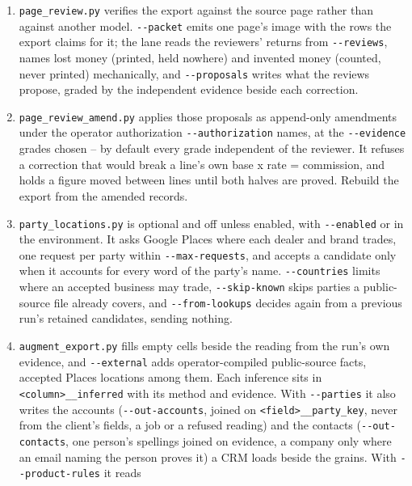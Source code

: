 \documentclass[
]{article}
\providecommand{\tightlist}{%
  \setlength{\itemsep}{0pt}\setlength{\parskip}{0pt}}
\begin{document}
\begin{enumerate}
\def\labelenumi{\arabic{enumi}.}
\tightlist
\item
  \texttt{page\_\allowbreak{}review.py} verifies the export against the
  source page rather than against another model. \texttt{-\/-packet}
  emits one page's image with the rows the export claims for it; the
  lane reads the reviewers' returns from \texttt{-\/-reviews}, names
  lost money (printed, held nowhere) and invented money (counted, never
  printed) mechanically, and \texttt{-\/-proposals} writes what the
  reviews propose, graded by the independent evidence beside each
  correction.
\item
  \texttt{page\_\allowbreak{}review\_\allowbreak{}amend.py} applies
  those proposals as append-only amendments under the operator
  authorization \texttt{-\/-authorization} names, at the
  \texttt{-\/-evidence} grades chosen -- by default every grade
  independent of the reviewer. It refuses a correction that would break
  a line's own base x rate = commission, and holds a figure moved
  between lines until both halves are proved. Rebuild the export from
  the amended records.
\item
  \texttt{party\_\allowbreak{}locations.py} is optional and off unless
  enabled, with \texttt{-\/-enabled} or in the environment. It asks
  Google Places where each dealer and brand trades, one request per
  party within \texttt{-\/-max-requests}, and accepts a candidate only
  when it accounts for every word of the party's name.
  \texttt{-\/-countries} limits where an accepted business may trade,
  \texttt{-\/-skip-known} skips parties a public-source file already
  covers, and \texttt{-\/-from-lookups} decides again from a previous
  run's retained candidates, sending nothing.
\item
  \texttt{augment\_\allowbreak{}export.py} fills empty cells beside the
  reading from the run's own evidence, and \texttt{-\/-external} adds
  operator-compiled public-source facts, accepted Places locations among
  them. Each inference sits in
  \texttt{<column>\_\allowbreak{}\_\allowbreak{}inferred} with its
  method and evidence. With \texttt{-\/-parties} it also writes the
  accounts (\texttt{-\/-out-accounts}, joined on
  \texttt{<field>\_\allowbreak{}\_\allowbreak{}party\_\allowbreak{}key},
  never from the client's fields, a job or a refused reading) and the
  contacts (\texttt{-\/-out-contacts}, one person's spellings joined on
  evidence, a company only where an email naming the person proves it) a
  CRM loads beside the grains. With \texttt{-\/-product-rules} it reads

\end{enumerate}
\end{document}
